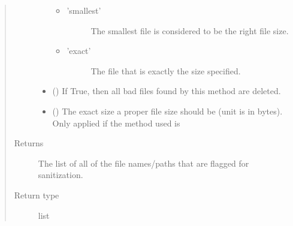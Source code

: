 \documentclass[letterpaper,10pt,english]{sphinxmanual}
\begin{document}
\begin{fulllineitems}
\begin{quote}
\begin{description}
\begin{itemize}
\begin{itemize}
\begin{description}
\end{description}

\item {} \begin{description}
\item[{’smallest’}] \leavevmode
The smallest  file is considered
to be the right file size.

\end{description}

\item {} \begin{description}
\item[{’exact’}] \leavevmode
The  file that is exactly the
size specified.

\end{description}

\end{itemize}


\item {} 
 (\sphinxstyleliteralemphasis{\sphinxupquote{ (}}\sphinxstyleliteralemphasis{\sphinxupquote{)}}) \textendash{} If True, then all bad files found by this method are deleted.

\item {} 
 (\sphinxstyleliteralemphasis{\sphinxupquote{ (}}\sphinxstyleliteralemphasis{\sphinxupquote{)}}) \textendash{} The exact size a proper file size should be (unit is in
bytes). Only applied if the method used is 

\end{itemize}

\item[{Returns}] \leavevmode
{} \textendash{} The list of all of the file names/paths that are flagged for
sanitization.

\item[{Return type}] \leavevmode
list

\end{description}\end{quote}

\end{fulllineitems}
\end{document}
